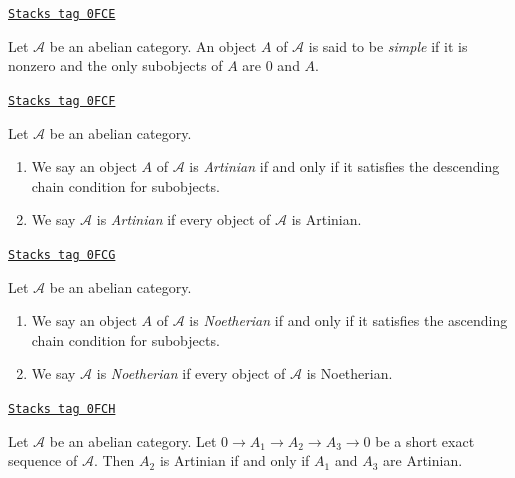 \begin{definition}[Simple]
\label{homology-definition-simple}
\href{https://stacks.math.columbia.edu/tag/0FCE}{\texttt{Stacks tag 0FCE}}

Let $\mathcal{A}$ be an abelian category. An object $A$ of $\mathcal{A}$
is said to be {\it simple} if it is nonzero and the only subobjects
of $A$ are $0$ and $A$.
\end{definition}

\begin{definition}[Artinian]
\label{homology-definition-Artinian}
\href{https://stacks.math.columbia.edu/tag/0FCF}{\texttt{Stacks tag 0FCF}}

Let $\mathcal{A}$ be an abelian category.
\begin{enumerate}
\item We say an object $A$ of $\mathcal{A}$ is {\it Artinian} if and only if
it satisfies the descending chain condition for subobjects.
\item We say $\mathcal{A}$ is {\it Artinian} if every object of
$\mathcal{A}$ is Artinian.
\end{enumerate}
\end{definition}

\begin{definition}[Noetherian]
\label{homology-definition-Noetherian}
\href{https://stacks.math.columbia.edu/tag/0FCG}{\texttt{Stacks tag 0FCG}}

Let $\mathcal{A}$ be an abelian category.
\begin{enumerate}
\item We say an object $A$ of $\mathcal{A}$ is {\it Noetherian} if and only if
it satisfies the ascending chain condition for subobjects.
\item We say $\mathcal{A}$ is {\it Noetherian} if every object of
$\mathcal{A}$ is Noetherian.
\end{enumerate}
\end{definition}

\begin{lemma}
\label{homology-lemma-ses-artinian}
\href{https://stacks.math.columbia.edu/tag/0FCH}{\texttt{Stacks tag 0FCH}}

Let $\mathcal{A}$ be an abelian category. Let $0 \to A_1 \to A_2 \to A_3 \to 0$
be a short exact sequence of $\mathcal{A}$. Then $A_2$ is Artinian
if and only if $A_1$ and $A_3$ are Artinian.
\end{lemma}

